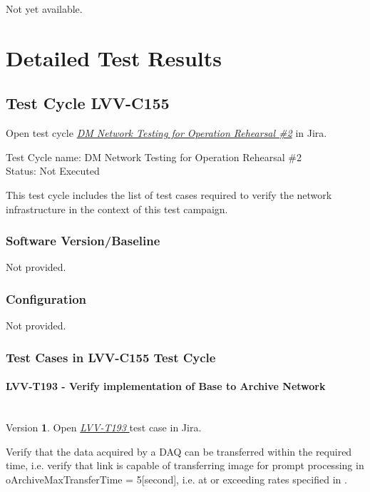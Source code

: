 \documentclass[DM,lsstdraft,STR,toc]{lsstdoc}
\begin{document}
Not yet available.

\newpage
\section{Detailed Test Results}
\label{sect:detailedtestresults}

\subsection{Test Cycle LVV-C155 }

Open test cycle {\it \href{https://jira.lsstcorp.org/secure/Tests.jspa#/testrun/LVV-C155}{DM Network Testing for Operation Rehearsal \#2}} in Jira.

Test Cycle name: DM Network Testing for Operation Rehearsal \#2\\
Status: Not Executed

This test cycle includes the list of test cases required to verify the
network infrastructure in the context of this test campaign.

\subsubsection{Software Version/Baseline}
Not provided.

\subsubsection{Configuration}
Not provided.

\subsubsection{Test Cases in LVV-C155 Test Cycle}

\paragraph{ LVV-T193 - Verify implementation of Base to Archive Network }\mbox{}\\

Version \textbf{1}.
Open  \href{https://jira.lsstcorp.org/secure/Tests.jspa#/testCase/LVV-T193}{\textit{ LVV-T193 } }
test case in Jira.

Verify that the data acquired by a DAQ can be transferred within the
required time, i.e. verify that link is capable of transferring image
for prompt processing in oArchiveMaxTransferTime = 5{[}second{]}, i.e.
at or exceeding rates specified in .
\end{document}
